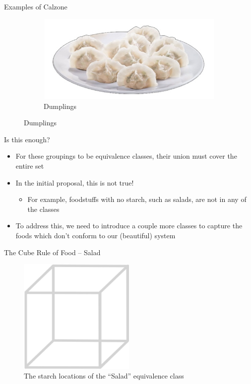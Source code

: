 \documentclass{beamer}
\begin{document}
\begin{frame}{Examples of Calzone}
\begin{figure}
\begin{subfigure}{.4\textwidth}
        \end{subfigure}%
        \begin{subfigure}{.4\textwidth}
          \centering
          \includegraphics[width=.8\linewidth]{calzone/28_dumplings.jpg}
          \caption{\label{fig:dumplings}Dumplings}
        \end{subfigure}
    \end{figure}
\end{frame}

\begin{frame}{Is this enough?}
    \begin{itemize}
        \item For these groupings to be equivalence classes, their union must cover the entire set
        \item In the initial proposal, this is not true!
        \begin{itemize}
            \item For example, foodstuffs with no starch, such as salads, are not in any of the classes
        \end{itemize}
        \item To address this, we need to introduce a couple more classes to capture the foods which don't conform to our (beautiful) system
    \end{itemize}
\end{frame}

\begin{frame}{The Cube Rule of Food -- Salad}
    \begin{figure}
        \includegraphics[width=0.5\textwidth]{salad/29_salad.jpg}
        \caption{\label{fig:salad-diagram}The starch locations of the ``Salad'' equivalence class}
    \end{figure}
\end{frame}
\end{document}

